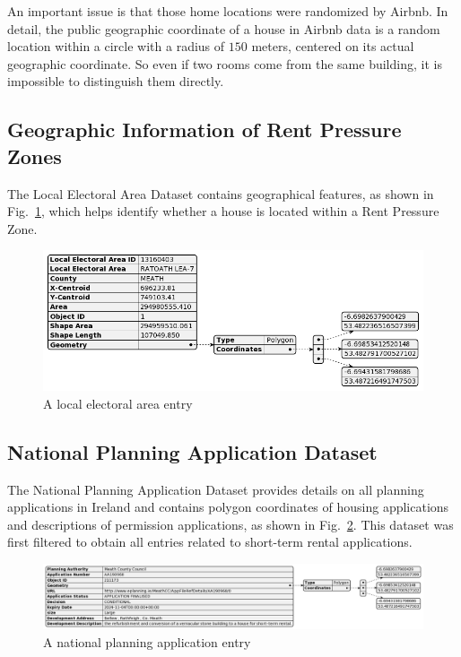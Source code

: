 \documentclass[conference, compsoc]{IEEEtran}
\begin{document}
An important issue is that those home locations were randomized by Airbnb.
In detail, the public geographic coordinate of a house in Airbnb data is a random location within a circle with a radius of $150$ meters, centered on its actual geographic coordinate.
So even if two rooms come from the same building, it is impossible to distinguish them directly.

\subsection{Geographic Information of Rent Pressure Zones}
The Local Electoral Area Dataset \cite{local-electoral-area-dataset} contains geographical features, as shown in Fig.~\ref{fig:local-electoral-area-entry}, which helps identify whether a house is located within a Rent Pressure Zone.

\begin{figure}[htbp]
    \centerline{\includegraphics[width=\linewidth]{figures/local-electoral-area-entry.png}}
    \caption{A local electoral area entry}
    \label{fig:local-electoral-area-entry}
\end{figure}

\subsection{National Planning Application Dataset}
The National Planning Application Dataset \cite{national-planning-application-dataset} provides details on all planning applications in Ireland and contains polygon coordinates of housing applications and descriptions of permission applications, as shown in Fig.~\ref{fig:national-planning-application-entry}.
This dataset was first filtered to obtain all entries related to short-term rental applications.

\begin{figure}[htbp]
    \centerline{\includegraphics[width=\linewidth]{figures/national-planning-application-entry.png}}
    \caption{A national planning application entry}
    \label{fig:national-planning-application-entry}
\end{figure}
\end{document}
